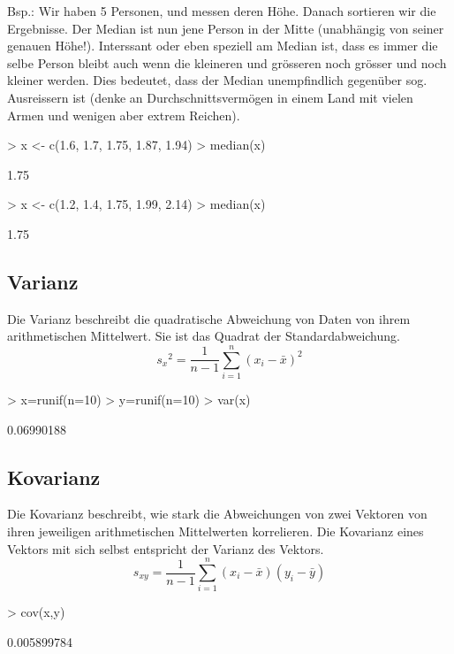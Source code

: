 Bsp.: Wir haben 5 Personen, und messen deren Höhe. Danach sortieren wir die
Ergebnisse. Der Median ist nun jene Person in der Mitte (unabhängig von seiner
genauen Höhe!). Interssant oder eben speziell am Median ist,
dass es immer die selbe Person bleibt auch wenn die kleineren und grösseren
noch grösser und noch kleiner werden. Dies bedeutet, dass der Median 
unempfindlich gegenüber sog. Ausreissern ist (denke an Durchschnittsvermögen
in einem Land mit vielen Armen und wenigen aber extrem Reichen).
\begin{Schunk}
\begin{Sinput}
> x <- c(1.6, 1.7, 1.75, 1.87, 1.94)
> median(x)
\end{Sinput}
\begin{Soutput}
[1] 1.75
\end{Soutput}
\begin{Sinput}
> x <- c(1.2, 1.4, 1.75, 1.99, 2.14)
> median(x)
\end{Sinput}
\begin{Soutput}
[1] 1.75
\end{Soutput}
\end{Schunk}

\subsection{Varianz}
Die Varianz beschreibt die quadratische Abweichung von Daten von ihrem 
arithmetischen Mittelwert. Sie ist das Quadrat der Standardabweichung. 
\[ {s_x}^2 = \frac{1}{n-1} \sum\limits_{i=1}^{n} (x_i - \bar{x})^2 \]
\begin{Schunk}
\begin{Sinput}
> x=runif(n=10)
> y=runif(n=10)
> var(x)
\end{Sinput}
\begin{Soutput}
[1] 0.06990188
\end{Soutput}
\end{Schunk}

\subsection{Kovarianz}
Die Kovarianz beschreibt, wie stark die Abweichungen von zwei Vektoren von 
ihren jeweiligen arithmetischen Mittelwerten korrelieren. Die Kovarianz 
eines Vektors mit sich selbst entspricht der Varianz des Vektors. 
\[ s_{xy} 
= \frac{1}{n-1} \sum\limits_{i=1}^{n} (x_i - \bar{x}) (y_i - \bar{y}) \]
\begin{Schunk}
\begin{Sinput}
> cov(x,y)
\end{Sinput}
\begin{Soutput}
[1] 0.005899784
\end{Soutput}
\end{Schunk}

